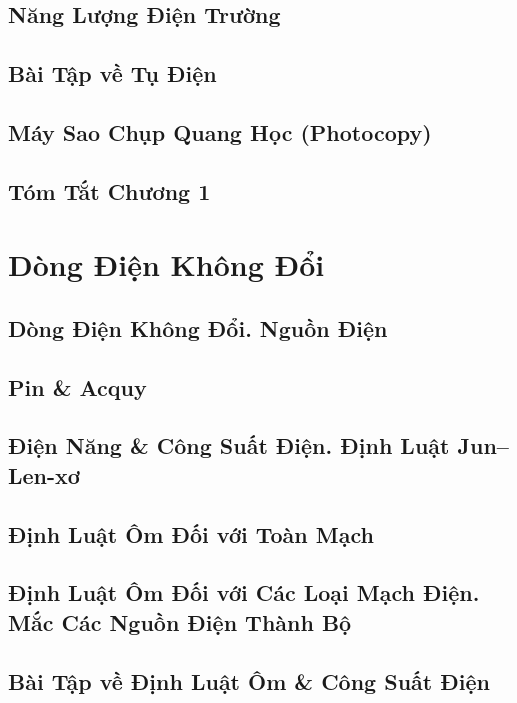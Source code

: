\documentclass[oneside]{book}
\numberwithin{equation}{section}
\begin{document}
\section{Năng Lượng Điện Trường}

\section{Bài Tập về Tụ Điện}

\section{Máy Sao Chụp Quang Học (Photocopy)}

\section{Tóm Tắt Chương 1}


\chapter{Dòng Điện Không Đổi}

\section{Dòng Điện Không Đổi. Nguồn Điện}

\section{Pin \& Acquy}

\section{Điện Năng \& Công Suất Điện. Định Luật Jun--Len-xơ}

\section{Định Luật Ôm Đối với Toàn Mạch}

\section{Định Luật Ôm Đối với Các Loại Mạch Điện. Mắc Các Nguồn Điện Thành Bộ}

\section{Bài Tập về Định Luật Ôm \& Công Suất Điện}
\end{document}
